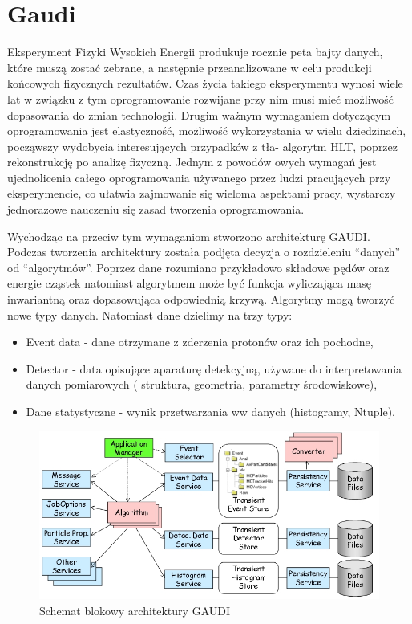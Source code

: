  \section{Gaudi}
 Eksperyment Fizyki Wysokich Energii produkuje rocznie peta bajty danych, które muszą zostać zebrane, a następnie przeanalizowane w celu produkcji końcowych fizycznych rezultatów. Czas życia takiego eksperymentu wynosi wiele lat w związku z tym oprogramowanie rozwijane przy nim musi mieć możliwość dopasowania do zmian technologii. Drugim ważnym wymaganiem dotyczącym oprogramowania jest elastyczność, możliwość wykorzystania w wielu dziedzinach, począwszy wydobycia interesujących przypadków z tła- algorytm HLT, poprzez rekonstrukcję po analizę fizyczną. Jednym z powodów owych wymagań jest ujednolicenia całego oprogramowania używanego przez ludzi pracujących przy eksperymencie, co ułatwia  zajmowanie się wieloma aspektami pracy, wystarczy jednorazowe nauczeniu się zasad tworzenia oprogramowania. 
 
Wychodząc na przeciw tym wymaganiom stworzono architekturę GAUDI\cite{GAUDI}. Podczas tworzenia architektury została podjęta decyzja o rozdzieleniu ``danych'' od ``algorytmów''. Poprzez dane rozumiano przykładowo składowe pędów oraz energie cząstek natomiast algorytmem może być funkcja wyliczająca masę inwariantną oraz dopasowująca odpowiednią krzywą. Algorytmy mogą tworzyć nowe typy danych. Natomiast dane dzielimy na trzy typy:
\begin{itemize}
 \item Event data - dane otrzymane z zderzenia protonów oraz ich pochodne,
 \item Detector - data opisujące aparaturę detekcyjną, używane do interpretowania danych pomiarowych ( struktura, geometria, parametry środowiskowe),
 \item Dane statystyczne - wynik przetwarzania ww danych (histogramy, Ntuple).
\end{itemize}
 \begin{figure}[h]
 \centering
 \includegraphics[scale=0.8]{rozdzial4/GAUDI.jpeg}
 \caption{Schemat blokowy architektury GAUDI\cite{GAUDI}}
 \label{rys:GAUDI architektura}
\end{figure}

